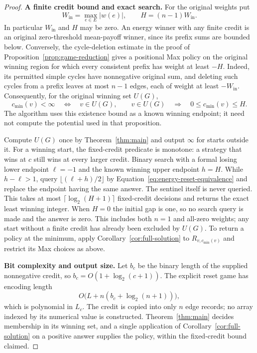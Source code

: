 \begin{proof}
\par\medskip\noindent\textbf{A finite credit bound and exact search.}\enspace
For the original weights put
\begin{equation}
 W_{\mathrm{in}}=\max_{e\in E}|w(e)|,
 \qquad H=(n-1)W_{\mathrm{in}}.
 \label{eq:energy-credit-bound}
\end{equation}
In particular $W_{\mathrm{in}}$ and $H$ may be zero. An energy winner
with any finite credit is an original zero-threshold mean-payoff
winner, since its prefix sums are bounded below. Conversely, the
cycle-deletion estimate in the proof of
Proposition~\ref{prop:game-reduction} gives a positional Max policy
on the original winning region for which every consistent prefix has
weight at least $-H$. Indeed, its permitted simple cycles have
nonnegative original sum, and deleting such cycles from a prefix leaves
at most $n-1$ edges, each of weight at least $-W_{\mathrm{in}}$.
Consequently, for the original winning set $U(G)$,
\begin{equation}
 c_{\min}(v)<\infty\quad\Longleftrightarrow\quad v\in U(G),
 \qquad
 v\in U(G)\quad\Longrightarrow\quad 0\le c_{\min}(v)\le H.
 \label{eq:energy-finite-equivalence}
\end{equation}
The algorithm uses this existence bound as a known winning endpoint;
it need not compute the potential used in that proposition.

Compute $U(G)$ once by Theorem~\ref{thm:main} and output $\infty$ for
starts outside it. For a winning start, the fixed-credit predicate is
monotone: a strategy that wins at $c$ still wins at every larger
credit. Binary search with a formal losing lower endpoint $\ell=-1$
and the known winning upper endpoint $h=H$. While $h-\ell>1$, query
$\lfloor(\ell+h)/2\rfloor$ by
Equation~\eqref{eq:energy-reset-equivalence} and replace the endpoint
having the same answer. The sentinel itself is never queried. This takes at most
$\lceil\log_2(H+1)\rceil$ fixed-credit decisions and returns the exact
least winning integer. When $H=0$ the initial gap is one, so no search
query is made and the answer is zero. This includes both $n=1$ and
all-zero weights; any start without a finite credit has already been
excluded by $U(G)$. To return a policy at the minimum, apply
Corollary~\ref{cor:full-solution} to $R_{v,c_{\min}(v)}$ and restrict
its Max choices as above.

\par\medskip\noindent\textbf{Bit complexity and output size.}\enspace
Let $b_c$ be the binary length of the supplied nonnegative credit,
so $b_c=O(1+\log_2(c+1))$. The explicit reset game has encoding length
\[
 O\bigl(L+n(b_c+\log_2(n+1))\bigr),
\]
which is polynomial in $L_c$. The credit is copied into only $n$ edge
records; no array indexed by its numerical value is constructed.
Theorem~\ref{thm:main} decides membership in its winning set, and a
single application of Corollary~\ref{cor:full-solution} on a positive
answer supplies the policy, within the fixed-credit bound claimed.


\end{proof}
